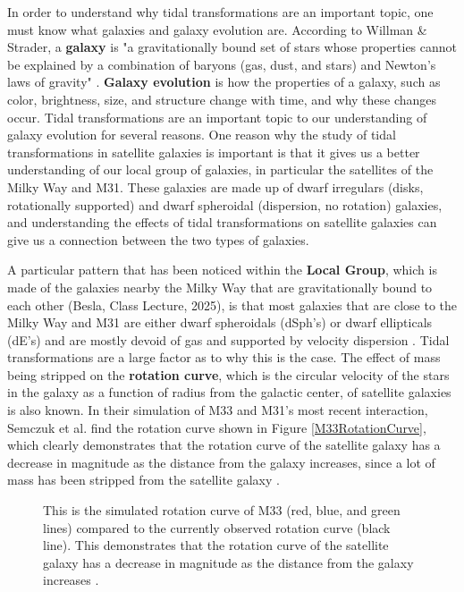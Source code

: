 \documentclass[trackchanges, twocolumn]{aastex7}
\begin{document}
In order to understand why tidal transformations are an important topic, one must know what galaxies and galaxy evolution are. According to Willman \& Strader, a \textbf{galaxy} is "a gravitationally bound set of stars whose properties cannot be explained by a combination of baryons (gas, dust, and stars) and Newton's laws of gravity" \citep{Willman2012}. \textbf{Galaxy evolution} is how the properties of a galaxy, such as color, brightness, size, and structure change with time, and why these changes occur. Tidal transformations are an important topic to our understanding of galaxy evolution for several reasons. One reason why the study of tidal transformations in satellite galaxies is important is that it gives us a better understanding of our local group of galaxies, in particular the satellites of the Milky Way and M31. These galaxies are made up of dwarf irregulars (disks, rotationally supported) and dwarf spheroidal (dispersion, no rotation) galaxies, and understanding the effects of tidal transformations on satellite galaxies can give us a connection between the two types of galaxies.

A particular pattern that has been noticed within the \textbf{Local Group}, which is made of the galaxies nearby the Milky Way that are gravitationally bound to each other (Besla, Class Lecture, 2025), is that most galaxies that are close to the Milky Way and M31 are either dwarf spheroidals (dSph’s) or dwarf ellipticals (dE's) and are mostly devoid of gas and supported by velocity dispersion \citep{Mayer2001}. Tidal transformations are a large factor as to why this is the case. The effect of mass being stripped on the \textbf{rotation curve}, which is the circular velocity of the stars in the galaxy as a function of radius from the galactic center, of satellite galaxies is also known. In their simulation of M33 and M31's most recent interaction, Semczuk et al. find the rotation curve shown in Figure \ref{M33RotationCurve}, which clearly demonstrates that the rotation curve of the satellite galaxy has a decrease in magnitude as the distance from the galaxy increases, since a lot of mass has been stripped from the satellite galaxy \citep{Semczuk2018}.

\begin{figure}[ht!] \label{M33RotationCurve}
\caption{ This is the simulated rotation curve of M33 (red, blue, and green lines) compared to the currently observed rotation curve (black line). This demonstrates that the rotation curve of the satellite galaxy has a decrease in magnitude as the distance from the galaxy increases \citep{Semczuk2018}.
\label{fig:general}}
\end{figure}
\end{document}
